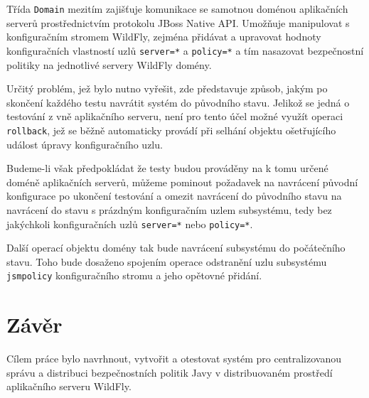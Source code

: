 Třída {\tt Domain} mezitím zajišťuje komunikace se samotnou doménou aplikačních serverů prostřednictvím protokolu JBoss Native API. Umožňuje manipulovat s konfiguračním stromem WildFly, zejména přidávat a upravovat hodnoty konfiguračních vlastností uzlů {\tt server=*} a {\tt policy=*} a tím nasazovat bezpečnostní politiky na jednotlivé servery WildFly domény.

Určitý problém, jež bylo nutno vyřešit, zde představuje způsob, jakým po skončení každého testu navrátit systém do původního stavu. Jelikož se jedná o testování z vně aplikačního serveru, není pro tento účel možné využít operaci {\tt rollback}, jež se běžně automaticky provádí při selhání objektu ošetřujícího událost úpravy konfiguračního uzlu.

Budeme-li však předpokládat že testy budou prováděny na k tomu určené doméně aplikačních serverů, můžeme pominout požadavek na navrácení původní konfigurace po ukončení testování a omezit navrácení do původního stavu na navrácení do stavu s prázdným konfiguračním uzlem subsystému, tedy bez jakýchkoli konfiguračních uzlů 
{\tt server=*} nebo {\tt policy=*}.

Další operací objektu domény tak bude navrácení subsystému do počátečního stavu. Toho bude dosaženo spojením operace odstranění uzlu subsystému {\tt jsmpolicy} konfiguračního stromu a jeho opětovné přidání.

\chapter{Závěr}

Cílem práce bylo navrhnout, vytvořit a otestovat systém pro centralizovanou správu a distribuci bezpečnostních politik Javy v distribuovaném prostředí aplikačního serveru WildFly.


